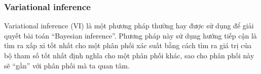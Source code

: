 

 
        
        \subsubsection{Variational inference}
        Variational inference (VI) là một phương pháp thường hay được sử dụng để giải quyết bài toán ``Bayesian inference''.
        Phương pháp này sử dụng hướng tiếp cận là tìm ra xấp xỉ tốt nhất cho một phân phối xác suất bằng cách tìm ra giá trị của bộ tham số tốt nhất định nghĩa cho một phân phối khác, sao cho phân phối này sẽ ``gần'' với phân phối mà ta quan tâm. 
        
